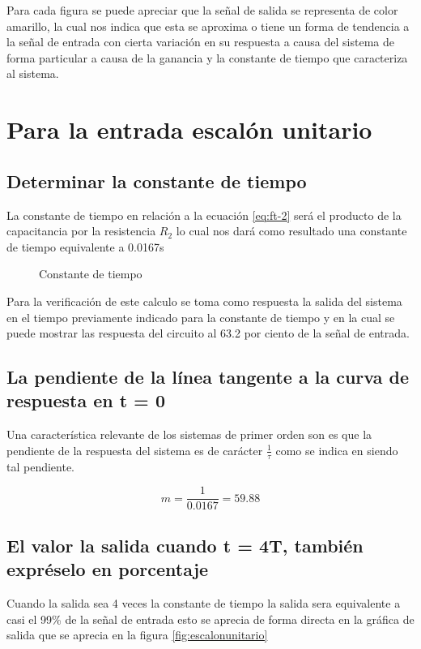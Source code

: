 \documentclass[conference]{IEEEtran}
\begin{document}
	Para cada figura se puede apreciar que la señal de salida se representa de color amarillo, la cual nos indica que esta se aproxima o tiene un forma de tendencia a la señal de entrada con cierta variación en su respuesta a causa del sistema de forma particular a causa de la ganancia y la constante de tiempo que caracteriza al sistema.
	
	\section{Para la entrada escalón unitario}
	\subsection{Determinar la constante de tiempo}
	La constante de tiempo en relación a la ecuación \ref{eq:ft-2} será el producto de la capacitancia por la resistencia $R_2$ lo cual nos dará como resultado una constante de tiempo equivalente a 0.0167s
	
	\begin{figure}[h]
		\centering
		\caption{Constante de tiempo}
		\label{fig:tau-escalon}
	\end{figure}
	
	Para la verificación de este calculo se toma como respuesta la salida del sistema en el tiempo previamente indicado para la constante de tiempo y en la  cual se puede mostrar las respuesta del circuito al 63.2 por ciento de la señal de entrada.
	
	\subsection{La pendiente de la línea tangente a la curva de respuesta en t = 0}
	Una característica relevante de los sistemas de primer orden son es que la pendiente de la respuesta del sistema es de carácter $\frac{1}{\tau}$ como se indica en siendo tal pendiente.
	
	\begin{equation}
		m = \frac{1}{0.0167} = 59.88
	\end{equation}
	
	\subsection{El valor la salida cuando t = 4T, también expréselo en porcentaje}
	
	Cuando la salida sea 4 veces la constante de tiempo la salida sera equivalente a casi el 99\%  de la señal de entrada esto se aprecia de forma directa en la gráfica de salida que se aprecia en la figura \ref{fig:escalonunitario}
	
\end{document}
